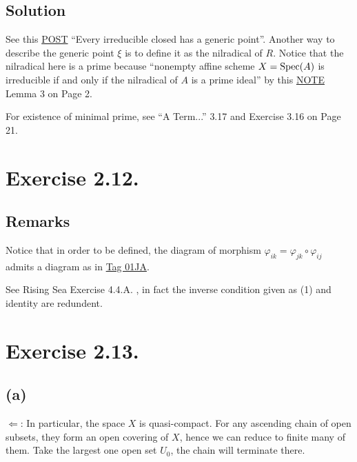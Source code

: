\subsection{Solution}

See this \href{https://math.stackexchange.com/questions/3744236/every-irreducible-closed-has-a-generic-point#comment7703441_3745580}{POST} \enquote{Every irreducible closed has a generic point}. Another way to describe the generic point $\xi$ is to define it as the nilradical of $R$. Notice that the nilradical here is a prime because \enquote{nonempty aﬃne scheme $X = \operatorname{Spec}(A)$ is irreducible if and only if the nilradical of $A$ is a prime ideal} by this \href{https://ocw.mit.edu/courses/18-726-algebraic-geometry-spring-2009/3723a99e97b581828fd782b9ffd83921_MIT18_726s09_lec11_more_schemes.pdf}{NOTE} Lemma 3 on Page 2.

For existence of minimal prime, see \enquote{A Term...} \cite{altman2013term} 3.17 and Exercise 3.16 on Page 21. 

\section{Exercise 2.12.}

\subsection{Remarks}

Notice that in order to be defined, the diagram of morphism $\varphi_{ik}=\varphi_{jk}\circ\varphi_{ij}$ admits a diagram as in \href{https://stacks.math.columbia.edu/tag/01JA}{Tag 01JA}.

See Rising Sea Exercise 4.4.A. , in fact the inverse condition given as (1) and identity are redundent.

\section{Exercise 2.13.}\label{Hart Chap 2 Ex 2.13.}

\subsection{(a)}

$\Leftarrow$: In particular, the space $X$ is quasi-compact. For any ascending chain of open subsets, they form an open covering of $X$, hence we can reduce to finite many of them. Take the largest one open set $U_0$, the chain will terminate there. 

